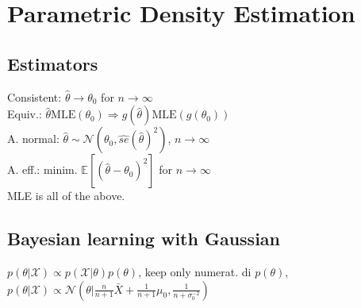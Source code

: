 \section*{Parametric Density Estimation}
\subsection*{Estimators}
Consistent: $\hat{\theta}\rightarrow\theta_0$ for $n\rightarrow\infty$\\
Equiv.: $\hat{\theta} \mathrm{MLE}(\theta_0) \Rightarrow g(\hat{\theta}) \mathrm{MLE}(g(\theta_0))$ \\
A. normal: $\hat{\theta}\sim\mathcal{N}(\theta_0, \hat{se}(\hat{\theta})^2)$, $n\rightarrow\infty$\\
A. eff.: minim. $\mathbb{E}[(\hat{\theta} - \theta_0)^2]$ for $n\rightarrow\infty$\\
MLE is all of the above. \\

\subsection*{Bayesian learning with Gaussian}
$p(\theta|\mathcal{X}) \propto p(\mathcal{X}|\theta)p(\theta) $, keep only numerat. di $p(\theta)$, \\
$p(\theta|\mathcal{X}) \propto \mathcal{N}(\theta|\frac{n}{n+1}\bar{X}+\frac1{n+1}\mu_0, \frac1{n+\sigma_0^{-2}})$
    